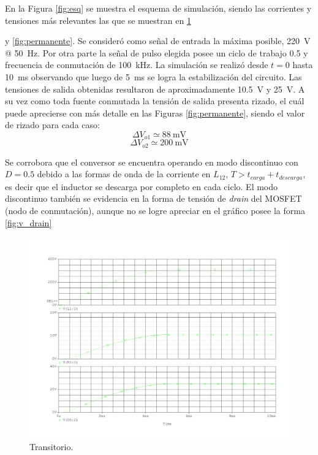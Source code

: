 	En la Figura \ref{fig:esq} se muestra el esquema de simulación, siendo las corrientes y tensiones más relevantes las que se muestran en \ref{fig:transitorio}{ y \ref{fig:permanente}. Se consideró como señal de entrada la máxima posible, \SI{220}{\volt} @ \SI{50}{\hertz}. Por otra parte la señal de pulso elegida posee un ciclo de trabajo \num{0,5} y frecuencia de conmutación de \SI{100}{\kilo\hertz}. La simulación se realizó desde $t=0$ hasta \SI{10}{\milli\second} observando que luego de \SI{5}{\milli\second} se logra la estabilización del circuito. Las tensiones de salida obtenidas resultaron de aproximadamente \SI{10.5}{\volt} y \SI{25}{\volt}.
	A su vez como toda fuente conmutada la tensión de salida presenta rizado, el cuál puede aprecierse con más detalle en las Figuras \ref{fig:permanente}, siendo el valor de rizado para cada caso:
	$$\Delta V_{o1} \simeq \SI{88}{\milli\volt} $$
	$$ \Delta V_{o2} \simeq \SI{200}{\milli\volt} $$

	Se corrobora que el conversor se encuentra operando en modo discontinuo con $D=\num{0,5}$ debido a las formas de onda de la corriente en $L_{12}$, $T>t_{carga}+t_{descarga}$, es decir que el inductor se descarga por completo en cada ciclo. El modo discontinuo también se evidencia en la forma de tensión de \textit{drain} del MOSFET (nodo de conmutación), aunque no se logre apreciar en el gráfico posee la forma \ref{fig:v_drain}




\begin{figure}[H]
	\centering
	\includegraphics[scale=0.5]{Figuras/1_transitorio_con_rectificador.pdf}
	\caption{Transitorio.}
	\label{fig:transitorio}
\end{figure}

}
